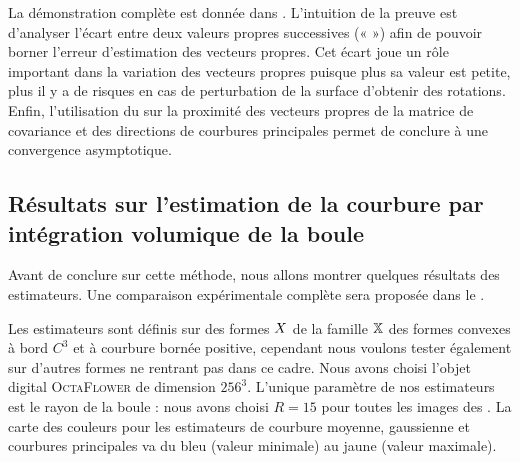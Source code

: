 La démonstration complète est donnée dans \cite{ChapterIICurvature}. L'intuition
de la preuve est d'analyser l'écart entre deux valeurs propres successives («
 ») afin de pouvoir borner l'erreur d'estimation
des vecteurs propres. Cet écart joue un rôle important dans la variation des
vecteurs propres puisque plus sa valeur est petite, plus il y a de risques en
cas de perturbation de la surface d'obtenir des rotations. Enfin, l'utilisation
du  sur la proximité des vecteurs propres de la
matrice de covariance et des directions de courbures principales permet de
conclure à une convergence asymptotique.
%
\subsection{Résultats sur l'estimation de la courbure par intégration volumique de la boule}
%
Avant de conclure sur cette méthode, nous allons montrer quelques résultats des
estimateurs. Une comparaison expérimentale complète sera proposée dans le
.

Les estimateurs sont définis sur des formes $X$ de la famille $\mathbb{X}$ des
formes convexes à bord $C^3$ et à courbure bornée positive, cependant nous
voulons tester également sur d'autres formes ne rentrant pas dans ce cadre. Nous
avons choisi l'objet digital \textsc{OctaFlower} de dimension $256^3$. L'unique
paramètre de nos estimateurs est le rayon de la boule : nous avons choisi $R=15$
pour toutes les images des
. La carte des couleurs
pour les estimateurs de courbure moyenne, gaussienne et courbures principales va
du bleu (valeur minimale) au jaune (valeur maximale).

